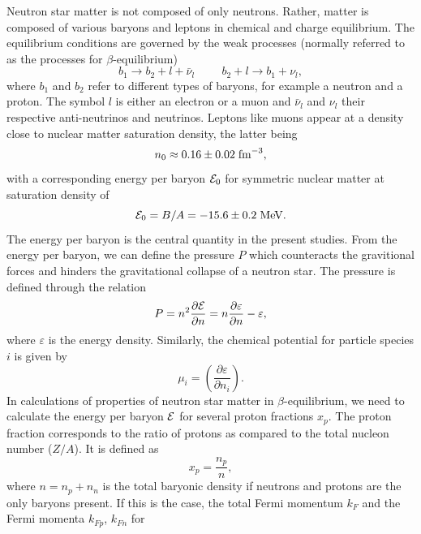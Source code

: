 Neutron star matter is not composed of only neutrons. Rather, matter
is composed of various baryons and leptons in chemical and charge
equilibrium.  The equilibrium conditions are governed by the weak
processes (normally referred to as the processes for
$\beta$-equilibrium)
\begin{equation} 
      b_1 \rightarrow b_2 + l +\bar{\nu}_l \hspace{1cm} b_2 +l
      \rightarrow b_1 +\nu_l,
      \label{eq:betadecay}
\end{equation}
where $b_1$ and $b_2$ refer to different types of baryons, for example
a neutron and a proton.  The symbol $l$ is either an electron or a
muon and $\bar{\nu}_l $ and $\nu_l$ their respective anti-neutrinos
and neutrinos. Leptons like muons appear at a density close to nuclear
matter saturation density, the latter being
\[
     n_0 \approx 0.16 \pm 0.02 \hspace{0.1cm} \mathrm{fm}^{-3},
\]
with a corresponding energy per baryon ${\cal E}_0$ for symmetric
nuclear matter at saturation density of
\[
     {\cal E}_0 = B/A=-15.6\pm 0.2 \hspace{0.1cm} \mathrm{MeV}.
\]
The energy per baryon is the central quantity in the present
studies. From the energy per baryon, we can define the pressure $P$
which counteracts the gravitional forces and hinders the gravitational
collapse of a neutron star. The pressure is defined through the
relation
\begin{equation}
    P=n^2\frac{\partial {\cal E}}{\partial n}= n\frac{\partial
      \varepsilon}{\partial n}-\varepsilon,
\end{equation}
where $\varepsilon$ is the energy density.  Similarly, the chemical
potential for particle species $i$ is given by
\begin{equation}
     \mu_i = \left(\frac{\partial \varepsilon}{\partial n_i}\right).
     \label{eq:chemicalpotdef}
\end{equation}
In calculations of properties of neutron star matter in
$\beta$-equilibrium, we need to calculate the energy per baryon ${\cal E}$ 
for several proton fractions $x_p$. The proton fraction
corresponds to the ratio of protons as compared to the total nucleon
number ($Z/A$). It is defined as
\begin{equation}
    x_p = \frac{n_p}{n},
\end{equation}
where $n=n_p+n_n$ is the total baryonic density if neutrons and
protons are the only baryons present. If this is the case, the total
Fermi momentum $k_F$ and the Fermi momenta $k_{Fp}$, $k_{Fn}$ for
